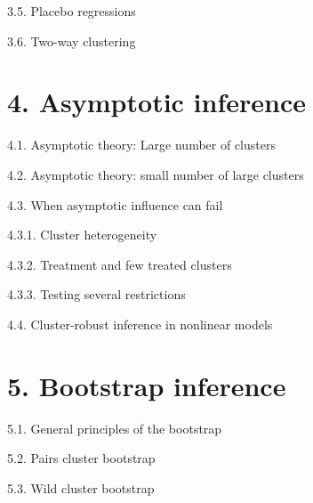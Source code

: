 \documentclass[xcolor=svgnames,aspectratio=169]{beamer}
\begin{document}
\begin{frame}{3.5. Placebo regressions}
\end{frame}

\begin{frame}{3.6. Two-way clustering}
\end{frame}

\section{4. Asymptotic inference}

\begin{frame}{4.1. Asymptotic theory: Large number of clusters}
\end{frame}

\begin{frame}{4.2. Asymptotic theory: small number of large clusters}
\end{frame}

\begin{frame}{4.3. When asymptotic influence can fail}
\end{frame}

\begin{frame}{4.3.1. Cluster heterogeneity}
\end{frame}

\begin{frame}{4.3.2. Treatment and few treated clusters}
\end{frame}

\begin{frame}{4.3.3. Testing several restrictions}
\end{frame}

\begin{frame}{4.4. Cluster-robust inference in nonlinear models}
\end{frame}

\section{5. Bootstrap inference}

\begin{frame}{5.1. General principles of the bootstrap}
\end{frame}

\begin{frame}{5.2. Pairs cluster bootstrap}
\end{frame}

\begin{frame}{5.3. Wild cluster bootstrap}
\end{frame}
\end{document}
